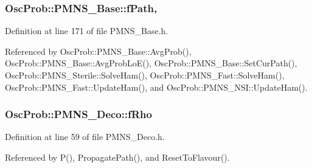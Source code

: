 \subsubsection[{\texorpdfstring{f\+Path}{fPath}}]{ Osc\+Prob\+::\+P\+M\+N\+S\+\_\+\+Base\+::f\+Path\hspace{0.3cm}{\ttfamily [protected]}, {\ttfamily [inherited]}}\hypertarget{classOscProb_1_1PMNS__Base_a849437aa8891fe042e86886ce8f81c6e}{}\label{classOscProb_1_1PMNS__Base_a849437aa8891fe042e86886ce8f81c6e}


Definition at line 171 of file P\+M\+N\+S\+\_\+\+Base.\+h.



Referenced by Osc\+Prob\+::\+P\+M\+N\+S\+\_\+\+Base\+::\+Avg\+Prob(), Osc\+Prob\+::\+P\+M\+N\+S\+\_\+\+Base\+::\+Avg\+Prob\+Lo\+E(), Osc\+Prob\+::\+P\+M\+N\+S\+\_\+\+Base\+::\+Set\+Cur\+Path(), Osc\+Prob\+::\+P\+M\+N\+S\+\_\+\+Sterile\+::\+Solve\+Ham(), Osc\+Prob\+::\+P\+M\+N\+S\+\_\+\+Fast\+::\+Solve\+Ham(), Osc\+Prob\+::\+P\+M\+N\+S\+\_\+\+Fast\+::\+Update\+Ham(), and Osc\+Prob\+::\+P\+M\+N\+S\+\_\+\+N\+S\+I\+::\+Update\+Ham().

\subsubsection[{\texorpdfstring{f\+Rho}{fRho}}]{ Osc\+Prob\+::\+P\+M\+N\+S\+\_\+\+Deco\+::f\+Rho\hspace{0.3cm}{\ttfamily [protected]}}\hypertarget{classOscProb_1_1PMNS__Deco_a0488d62b4ef4cf5b43425769f5fcdbdf}{}\label{classOscProb_1_1PMNS__Deco_a0488d62b4ef4cf5b43425769f5fcdbdf}


Definition at line 59 of file P\+M\+N\+S\+\_\+\+Deco.\+h.



Referenced by P(), Propagate\+Path(), and Reset\+To\+Flavour().

